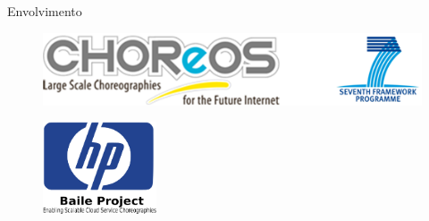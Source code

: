 \documentclass[xcolor=svgnames]{beamer}
\begin{document}
    \begin{frame}{Envolvimento}
      	\begin{figure}[!h]
	    \centering
	    \includegraphics[scale=0.6]{CHOReOSProject.png}
	\end{figure}

	\begin{figure}[!h]
	    \centering
	    \includegraphics[width=0.3\textwidth]{hp_logo_2.png}
	\end{figure}
	
    \end{frame}

 \begin{frame}
 \end{frame}
\end{document}

